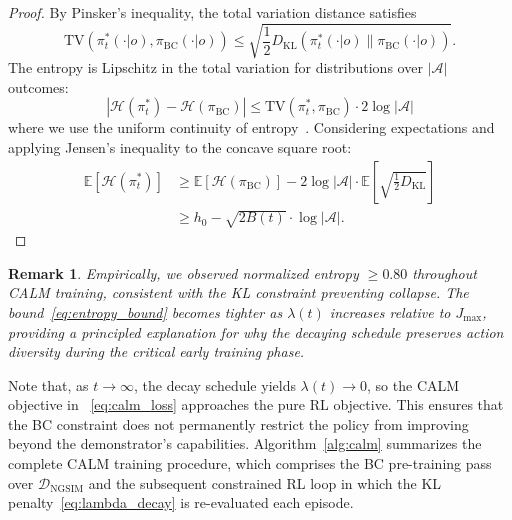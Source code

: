 \documentclass[journal]{IEEEtran}
\newtheorem{remark}{Remark}
\newcommand{\KL}{\mathrm{KL}}
\newcommand{\E}{\mathbb{E}}
\newcommand{\cA}{\mathcal{A}}
\begin{document}
\begin{proof}
By Pinsker's inequality, the total variation distance satisfies
\begin{equation}
    \text{TV}(\pi_t^*(\cdot|o), \pi_{\text{BC}}(\cdot|o)) \leq \sqrt{\frac{1}{2}D_{\KL}(\pi_t^*(\cdot|o) \| \pi_{\text{BC}}(\cdot|o))}.
\end{equation}
The entropy is Lipschitz in the total variation for distributions over $|\cA|$ outcomes:
\begin{equation}
    |\mathcal{H}(\pi_t^*) - \mathcal{H}(\pi_{\text{BC}})| \leq \text{TV}(\pi_t^*, \pi_{\text{BC}}) \cdot 2\log|\cA|
\end{equation}
where we use the uniform continuity of entropy~\cite{cover2006elements}. Considering expectations and applying Jensen's inequality to the concave square root:
\begin{align}
    \E[\mathcal{H}(\pi_t^*)] &\geq \E[\mathcal{H}(\pi_{\text{BC}})] - 2\log|\cA| \cdot \E\left[\sqrt{\tfrac{1}{2}D_{\KL}}\right] \\
    &\geq h_0 - \sqrt{2 B(t)} \cdot \log|\cA|.
\end{align}
\end{proof}

\begin{remark}
Empirically, we observed normalized entropy $\geq 0.80$ throughout CALM training, consistent with the KL constraint preventing collapse. The bound~\eqref{eq:entropy_bound} becomes tighter as $\lambda(t)$ increases relative to $J_{\max}$, providing a principled explanation for why the decaying schedule preserves action diversity during the critical early training phase.
\end{remark}

Note that, as $t \to \infty$, the decay schedule yields $\lambda(t) \to 0$, so the CALM objective in ~\eqref{eq:calm_loss} approaches the pure RL objective. This ensures that the BC constraint does not permanently restrict the policy from improving beyond the demonstrator's capabilities. Algorithm~\ref{alg:calm} summarizes the complete CALM training procedure, which comprises the BC pre-training pass over $\mathcal{D}_{\text{NGSIM}}$ and the subsequent constrained RL loop in which the KL penalty~\eqref{eq:lambda_decay} is re-evaluated each episode.
\end{document}
